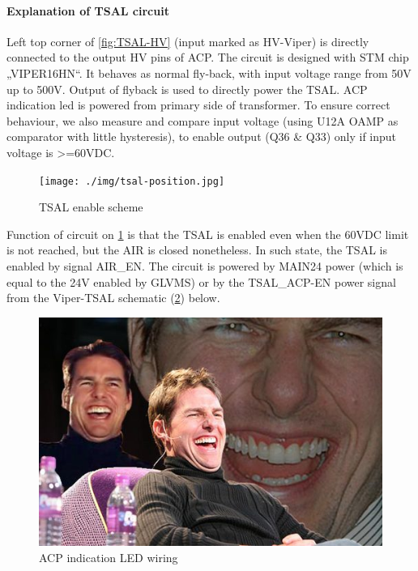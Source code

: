 \paragraph{Explanation of TSAL circuit}

Left top corner of \ref{fig:TSAL-HV} (input marked as HV-Viper) is directly connected to the output HV pins of ACP. The circuit is designed with STM chip „VIPER16HN“. It behaves as normal fly-back, with input voltage range from 50V up to 500V. Output of flyback is used to directly power the TSAL. ACP indication led is powered from primary side of transformer. To ensure correct behaviour, we also measure and compare input voltage (using U12A OAMP as comparator with little hysteresis), to enable output (Q36 \& Q33) only if input voltage is >=60VDC.

\begin{figure}[H]
	\centering
	\texttt{[image: ./img/tsal-position.jpg]}
	\caption{TSAL enable scheme}
	\label{fig:TSAL-enable}
\end{figure}

Function of circuit on \ref{fig:TSAL-enable} is that the TSAL is enabled even when the 60VDC limit is not reached, but the AIR is closed nonetheless. In such state, the TSAL is enabled by signal AIR\_EN. The circuit is powered by MAIN24 power (which is equal to the 24V enabled by GLVMS) or by the TSAL\_ACP-EN power signal from the Viper-TSAL schematic (\ref{fig:TSAL-ACPindicator}) below.

\begin{figure}[H]
	\centering
	\includegraphics[width=\textwidth]{./img/tsal-indicator.jpg}
	\caption{ACP indication LED wiring}
	\label{fig:TSAL-ACPindicator}
\end{figure}

